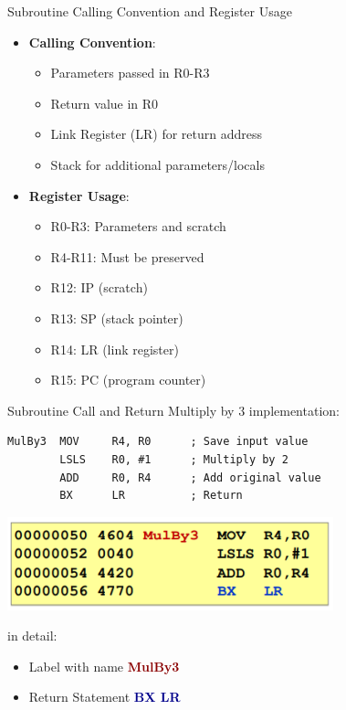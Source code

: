 \begin{theorem}{Subroutine Calling Convention and Register Usage}
\begin{itemize}
  \item \textbf{Calling Convention}:
    \begin{itemize}
      \item Parameters passed in R0-R3
      \item Return value in R0
      \item Link Register (LR) for return address
      \item Stack for additional parameters/locals
    \end{itemize}
  \item \textbf{Register Usage}:
    \begin{itemize}
      \item R0-R3: Parameters and scratch
      \item R4-R11: Must be preserved
      \item R12: IP (scratch)
      \item R13: SP (stack pointer)
      \item R14: LR (link register)
      \item R15: PC (program counter)
    \end{itemize}
\end{itemize}
\end{theorem}

\begin{example2}{Subroutine Call and Return}
Multiply by 3 implementation:
\begin{lstlisting}[language=armasm, style=basesmol]
MulBy3  MOV     R4, R0      ; Save input value
        LSLS    R0, #1      ; Multiply by 2
        ADD     R0, R4      ; Add original value
        BX      LR          ; Return
\end{lstlisting}

\begin{minipage}{0.58\linewidth}
\includegraphics[width=\linewidth]{images/subroutine.png}
\end{minipage}
\begin{minipage}{0.4\linewidth}
in detail:
\begin{itemize}
  \item Label with name \textcolor{darkred}{\textbf{MulBy3}}
  \item Return Statement \textcolor{darkblue}{\textbf{BX LR}}
\end{itemize}
\end{minipage}
\end{example2}

